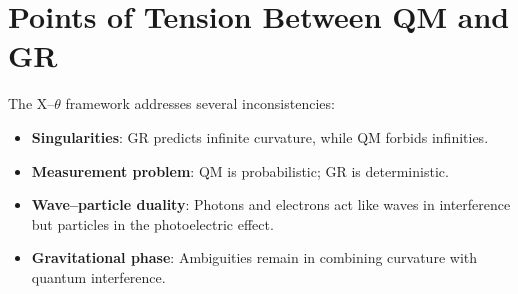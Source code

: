 \section{Points of Tension Between QM and GR}

The X--$\theta$ framework addresses several inconsistencies:

\begin{itemize}
  \item \textbf{Singularities}: GR predicts infinite curvature, while QM forbids
  infinities.
  \item \textbf{Measurement problem}: QM is probabilistic; GR is deterministic.
  \item \textbf{Wave--particle duality}: Photons and electrons act like waves in
  interference but particles in the photoelectric effect.
  \item \textbf{Gravitational phase}: Ambiguities remain in combining curvature
  with quantum interference.
\end{itemize}
